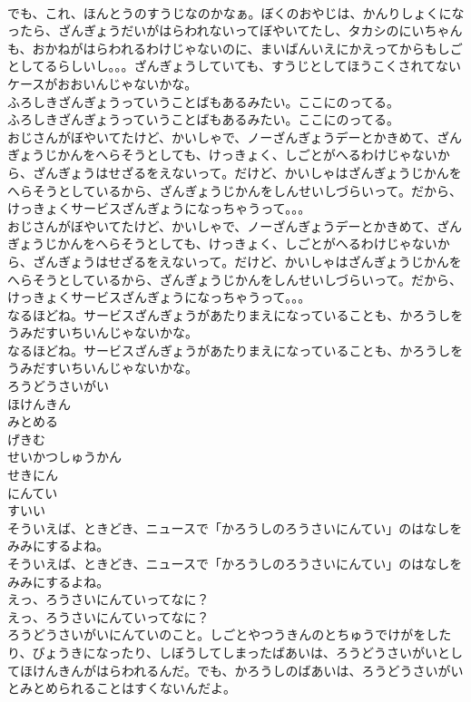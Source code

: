 \documentclass[8pt]{extreport}
\begin{document}
\begin{CJK}{UTF8}{min}
\\	でも、これ、ほんとうのすうじなのかなぁ。ぼくのおやじは、かんりしょくになったら、ざんぎょうだいがはらわれないってぼやいてたし、タカシのにいちゃんも、おかねがはらわれるわけじゃないのに、まいばんいえにかえってからもしごとしてるらしいし。。。ざんぎょうしていても、すうじとしてほうこくされてないケースがおおいんじゃないかな。
\\	ふろしきざんぎょうっていうことばもあるみたい。ここにのってる。
\\	ふろしきざんぎょうっていうことばもあるみたい。ここにのってる。
\\	おじさんがぼやいてたけど、かいしゃで、ノーざんぎょうデーとかきめて、ざんぎょうじかんをへらそうとしても、けっきょく、しごとがへるわけじゃないから、ざんぎょうはせざるをえないって。だけど、かいしゃはざんぎょうじかんをへらそうとしているから、ざんぎょうじかんをしんせいしづらいって。だから、けっきょくサービスざんぎょうになっちゃうって。。。
\\	おじさんがぼやいてたけど、かいしゃで、ノーざんぎょうデーとかきめて、ざんぎょうじかんをへらそうとしても、けっきょく、しごとがへるわけじゃないから、ざんぎょうはせざるをえないって。だけど、かいしゃはざんぎょうじかんをへらそうとしているから、ざんぎょうじかんをしんせいしづらいって。だから、けっきょくサービスざんぎょうになっちゃうって。。。
\\	なるほどね。サービスざんぎょうがあたりまえになっていることも、かろうしをうみだすいちいんじゃないかな。
\\	なるほどね。サービスざんぎょうがあたりまえになっていることも、かろうしをうみだすいちいんじゃないかな。
\\	ろうどうさいがい
\\	ほけんきん
\\	みとめる
\\	げきむ
\\	せいかつしゅうかん
\\	せきにん
\\	にんてい
\\	すいい
\\	そういえば、ときどき、ニュースで「かろうしのろうさいにんてい」のはなしをみみにするよね。
\\	そういえば、ときどき、ニュースで「かろうしのろうさいにんてい」のはなしをみみにするよね。
\\	えっ、ろうさいにんていってなに？
\\	えっ、ろうさいにんていってなに？
\\	ろうどうさいがいにんていのこと。しごとやつうきんのとちゅうでけがをしたり、びょうきになったり、しぼうしてしまったばあいは、ろうどうさいがいとしてほけんきんがはらわれるんだ。でも、かろうしのばあいは、ろうどうさいがいとみとめられることはすくないんだよ。

\end{CJK}
\end{document}
